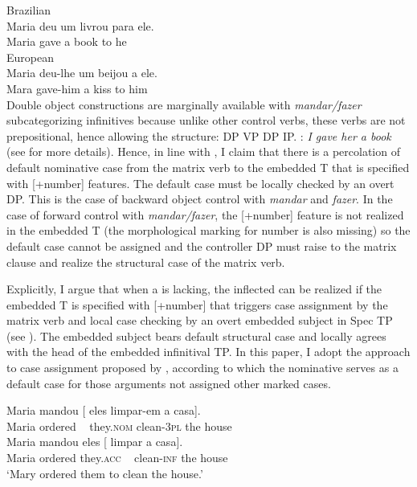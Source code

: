 \documentclass[output=paper]{langsci/langscibook}
\begin{document}
{\ea Brazilian \\
    \gll Maria deu   um livrou para ele.   \\
        Maria gave a     book  to      he\\
\z
\ea European  \\
    \gll Maria deu-lhe   um beijou a  ele. \\  
            Mara  gave-him a    kiss    to him\\
\z
Double object constructions are marginally available with \textit{mandar\slash fazer} subcategorizing infinitives because unlike other control verbs, these verbs are not prepositional, hence allowing the structure: DP VP DP IP.} : \textit{I gave her a book} (see \citealt{Larson1991} for more details). Hence, in line with \citet{Raposo1987}, I claim that there is a percolation of default nominative case from the matrix verb to the embedded T that is specified with [+number] features. The default case must be locally checked by an overt DP. This is the case of backward object control with \textit{mandar} and \textit{fazer}. In the case of forward control with \textit{mandar\slash fazer}, the [+number] feature is not realized in the embedded T (the morphological marking for number is also missing) so the default case cannot be assigned and the controller DP must raise to the matrix clause and realize the structural case of the matrix verb.

Explicitly, I argue that when a  is lacking, the inflected  can be realized if the embedded T is specified with [+number] that triggers case assignment by the matrix verb and local case checking by an overt embedded subject in Spec TP (see \citealt{Raposo1987}). The embedded subject bears default structural case and locally agrees with the head of the embedded infinitival TP. In this paper, I adopt the approach to case assignment proposed by \citet{McFadden2011}, according to which the nominative serves as a default case for those arguments not assigned other marked cases.

\ea%
    \label{ex:moreno:28}
    \ea
    \gll Maria mandou [ eles          limpar-em   a     casa].    \\
         Maria ordered  ~ they.\textsc{nom}   clean-\textsc{3pl}     the house\\
    \ex  
    \gll Maria mandou   eles [  limpar      a    casa]. \\
         Maria ordered   they.\textsc{acc}  ~ clean-\textsc{inf} the house \\
    \glt ‘Mary ordered them to clean the house.’
    \z
\z
\end{document}
